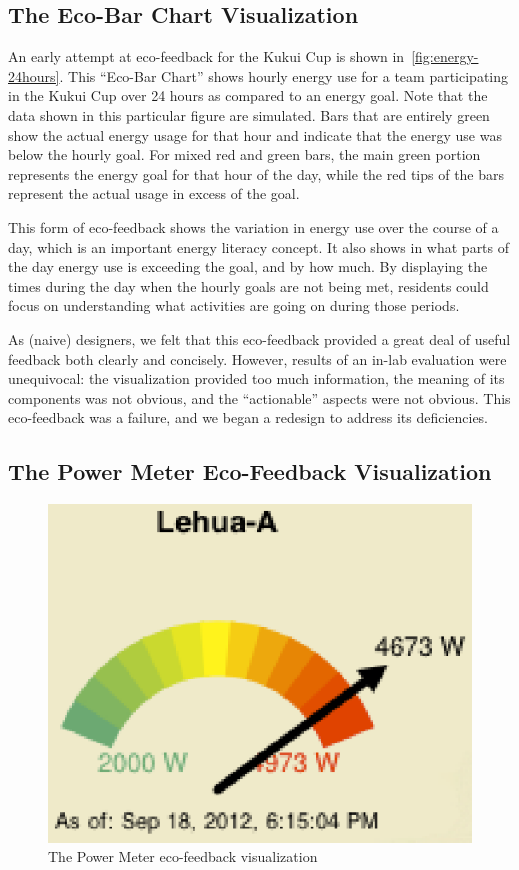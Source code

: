\documentclass{sigchi}
\begin{document}
\subsection{The Eco-Bar Chart Visualization}


An early attempt at eco-feedback for the Kukui Cup is shown in~\autoref{fig:energy-24hours}. This ``Eco-Bar Chart'' shows hourly energy use for a team participating in the Kukui Cup over 24 hours as compared to an energy goal. Note that the data shown in this particular figure are simulated. Bars that are entirely green show the actual energy usage for that hour and indicate that the energy use was below the hourly goal. For mixed red and green bars, the main green portion represents the energy goal for that hour of the day, while the red tips of the bars represent the actual usage in excess of the goal.

This form of eco-feedback shows the variation in energy use over the course of a day, which is an important energy literacy concept. It also shows in what parts of the day energy use is exceeding the goal, and by how much. By displaying the times during the day when the hourly goals are not being met, residents could focus on understanding what activities are going on during those periods.

As (naive) designers, we felt that this eco-feedback provided a great deal of useful feedback both clearly and concisely. However, results of an in-lab evaluation were unequivocal: the visualization provided too much information, the meaning of its components was not obvious, and the ``actionable'' aspects were not obvious. This eco-feedback was a failure, and we began a redesign to address its deficiencies.

\subsection{The Power Meter Eco-Feedback Visualization}

\begin{figure}[!tb]
	\centering
	\includegraphics[width=0.65\columnwidth]{power-meter.eps}
	\caption{The Power Meter eco-feedback visualization}
	\label{fig:power-meter}
\end{figure}
\end{document}
